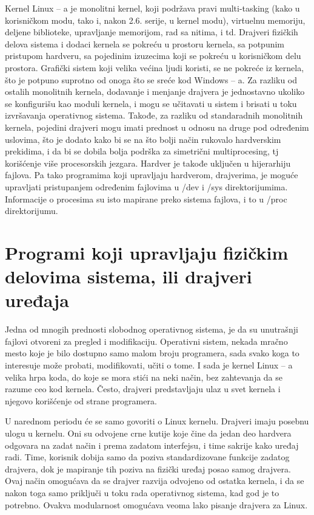 \documentclass[a4paper, 12pt, diplomski]{etf}
\begin{document}
	Kernel Linux – a je monolitni kernel, koji podržava pravi multi-tasking (kako u korisničkom modu, tako i, nakon 2.6. serije, u kernel modu), virtuelnu memoriju, deljene biblioteke, upravljanje memorijom, rad sa nitima, i td. Drajveri fizičkih delova sistema i dodaci kernela se pokreću u prostoru kernela, sa potpunim pristupom hardveru, sa pojedinim izuzecima koji se pokreću u korisničkom delu prostora. Grafički sistem koji velika većina ljudi koristi, se ne pokreće iz kernela, što je potpuno suprotno od onoga što se sreće kod Windows – a. Za razliku od ostalih monolitnih kernela, dodavanje i menjanje drajvera je jednostavno ukoliko se konfigurišu kao moduli kernela, i mogu se učitavati u sistem i brisati u toku izvršavanja operativnog sistema. Takođe, za razliku od standaradnih monolitnih kernela, pojedini drajveri mogu imati prednost u odnosu na druge pod određenim uslovima, što je dodato kako bi se na što bolji način rukovalo hardverskim prekidima, i da bi se dobila bolja podrška za simetrični multiprocesing, tj korišćenje više procesorskih jezgara. Hardver je takođe uključen u hijerarhiju fajlova. Pa tako programima koji upravljaju hardverom, drajverima, je moguće upravljati pristupanjem određenim fajlovima u /dev i /sys direktorijumima. Informacije o procesima su isto mapirane preko sistema fajlova, i to u /proc direktorijumu.

	\section{Programi koji upravljaju fizičkim delovima sistema, ili drajveri uređaja}

	Jedna od mnogih prednosti slobodnog operativnog sistema, je da su unutrašnji fajlovi otvoreni za pregled i modifikaciju. Operativni sistem, nekada mračno mesto koje je bilo dostupno samo malom broju programera, sada svako koga to interesuje može probati, modifikovati, učiti o tome. I sada je kernel Linux – a velika hrpa koda, do koje se mora stići na neki način, bez zahtevanja da se razume ceo kod kernela. Često, drajveri predstavljaju ulaz u svet kernela i njegovo korišćenje od strane programera.

	U narednom periodu će se samo govoriti o Linux kernelu. Drajveri imaju posebnu ulogu u kernelu. Oni su odvojene crne kutije koje čine da jedan deo hardvera odgovara na zadat način i prema zadatom interfejsu, i time sakrije kako uređaj radi. Time, korisnik dobija samo da poziva standardizovane funkcije zadatog drajvera, dok je mapiranje tih poziva na fizički uređaj posao samog drajvera. Ovaj način omogućava da se drajver razvija odvojeno od ostatka kernela, i da se nakon toga samo priključi u toku rada operativnog sistema, kad god je to potrebno. Ovakva modularnost omogućava veoma lako pisanje drajvera za Linux.
\end{document}
